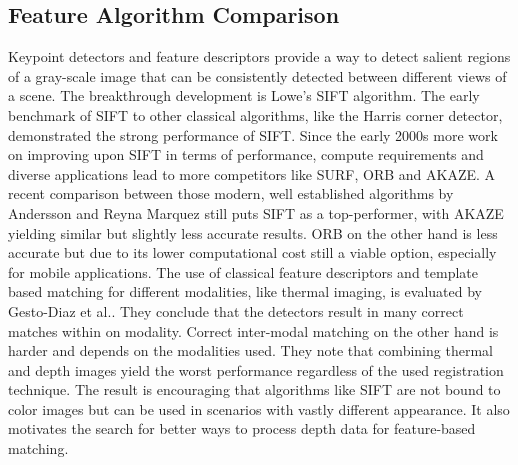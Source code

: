 \subsection{Feature Algorithm Comparison}

Keypoint detectors and \gls{feature} descriptors provide a way to detect salient regions of a gray-scale image that can be consistently detected between different views of a scene.
The breakthrough development is Lowe's SIFT\cite{lowe_ijcv04} algorithm.
The early benchmark\cite{mikolajczyk_pami2005} of SIFT to other classical algorithms, like the Harris corner detector\cite{harris_1988}, demonstrated the strong performance of SIFT.
Since the early 2000s more work on improving upon SIFT in terms of performance, compute requirements and diverse applications lead to more competitors like SURF\cite{bay_eccv06}, ORB\cite{rublee_iccv11} and AKAZE\cite{alcantarilla_bmva13}.
A recent comparison between those modern, well established algorithms by Andersson and Reyna Marquez\cite{andersson_2016} still puts SIFT as a top-performer, with AKAZE yielding similar but slightly less accurate results.
ORB\cite{rublee_iccv11} on the other hand is less accurate but due to its lower computational cost still a viable option, especially for mobile applications\cite{andersson_2016}.
The use of classical \gls{feature} descriptors and template based matching for different modalities, like thermal imaging, is evaluated by Gesto-Diaz et al.\cite{gesto-diaz_2017}.
They conclude that the detectors result in many correct matches within on modality.
Correct inter-modal matching on the other hand is harder and depends on the modalities used.
They note that combining thermal and depth images yield the worst performance regardless of the used registration technique.
The result is encouraging that algorithms like SIFT\cite{lowe_ijcv04} are not bound to color images but can be used in scenarios with vastly different appearance.
It also motivates the search for better ways to process depth data for \gls{feature}-based matching.
